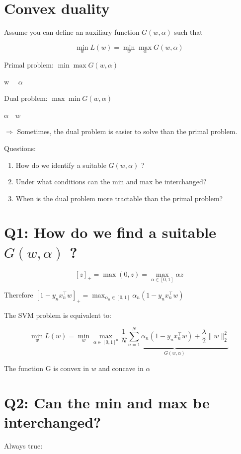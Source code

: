 \documentclass[10pt]{article}
\begin{document}
\section*{Convex duality}
Assume you can define an auxiliary function $G(w, \alpha)$ such that

$$
\min _{w} L(w)=\min _{w} \max _{\alpha} G(w, \alpha)
$$

Primal problem: $\min \max G(w, \alpha)$

w $\quad \alpha$

Dual problem: $\max \min G(w, \alpha)$

$\alpha \quad w$

$\Rightarrow$ Sometimes, the dual problem is easier to solve than the primal problem.

Questions:

\begin{enumerate}
  \item How do we identify a suitable $G(w, \alpha)$ ?

  \item Under what conditions can the min and max be interchanged?

  \item When is the dual problem more tractable than the primal problem?

\end{enumerate}

\section*{Q1: How do we find a suitable $G(w, \alpha)$ ?}
$$
[z]_{+}=\max (0, z)=\max _{\alpha \in[0,1]} \alpha z
$$

Therefore $\left[1-y_{n} x_{n}^{\top} w\right]_{+}=\max _{\alpha_{n} \in[0,1]} \alpha_{n}\left(1-y_{n} x_{n}^{\top} w\right)$

The SVM problem is equivalent to:

$$
\min _{w} L(w)=\min _{w} \max _{\alpha \in[0,1]^{n}} \underbrace{\frac{1}{N} \sum_{n=1}^{N} \alpha_{n}\left(1-y_{n} x_{n}^{\top} w\right)+\frac{\lambda}{2}\|w\|_{2}^{2}}_{G(w, \alpha)}
$$

The function $\mathrm{G}$ is convex in $w$ and concave in $\alpha$

\section*{Q2: Can the min and max be interchanged?}
Always true:
\end{document}
